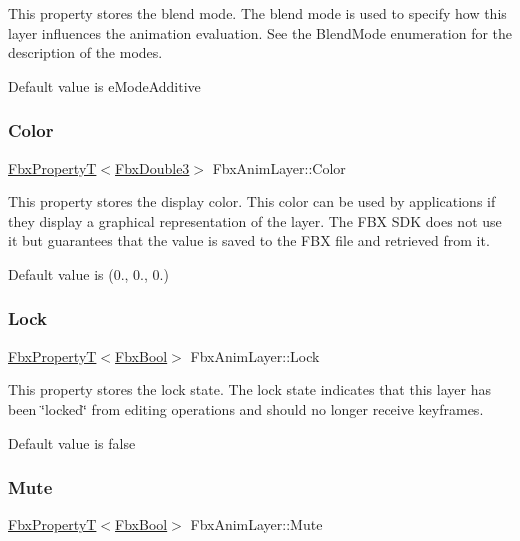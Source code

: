 This property stores the blend mode. The blend mode is used to specify how this layer influences the animation evaluation. See the Blend\+Mode enumeration for the description of the modes.

Default value is {\ttfamily e\+Mode\+Additive} \mbox{\label{class_fbx_anim_layer_a9eb1d3e6e4bcfc59122fe6261eb529bc}} 
\subsubsection{\texorpdfstring{Color}{Color}}
{\footnotesize\ttfamily \hyperlink{class_fbx_property_t}{Fbx\+PropertyT}$<$\hyperlink{fbxtypes_8h_ae0a96f14cde566774c7553aa7523b7a7}{Fbx\+Double3}$>$ Fbx\+Anim\+Layer\+::\+Color}

This property stores the display color. This color can be used by applications if they display a graphical representation of the layer. The F\+BX S\+DK does not use it but guarantees that the value is saved to the F\+BX file and retrieved from it.

Default value is {\ttfamily }(0., 0., 0.) \mbox{\label{class_fbx_anim_layer_ade773868b910bcfcedf4818b96da9233}} 
\subsubsection{\texorpdfstring{Lock}{Lock}}
{\footnotesize\ttfamily \hyperlink{class_fbx_property_t}{Fbx\+PropertyT}$<$\hyperlink{fbxtypes_8h_a92e0562b2fe33e76a242f498b362262e}{Fbx\+Bool}$>$ Fbx\+Anim\+Layer\+::\+Lock}

This property stores the lock state. The lock state indicates that this layer has been \char`\"{}locked\char`\"{} from editing operations and should no longer receive keyframes.

Default value is {\ttfamily false} \mbox{\label{class_fbx_anim_layer_ae8f8f6db5f57e41d42935720b4e8d582}} 
\subsubsection{\texorpdfstring{Mute}{Mute}}
{\footnotesize\ttfamily \hyperlink{class_fbx_property_t}{Fbx\+PropertyT}$<$\hyperlink{fbxtypes_8h_a92e0562b2fe33e76a242f498b362262e}{Fbx\+Bool}$>$ Fbx\+Anim\+Layer\+::\+Mute}

